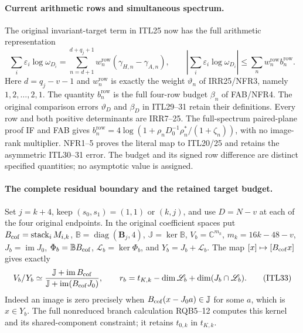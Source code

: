 \documentclass[11pt,a4paper]{article}
\begin{document}
\paragraph{Current arithmetic rows and simultaneous spectrum.}
The original invariant-target term in ITL25 now has the
full arithmetic representation
\[
 \sum_i\varepsilon_i\log\omega_{D_i}
   =\sum_{n=d+1}^{d+q_j+1}w_n^{\mathrm{row}}
                  (\gamma_{H,n}-\gamma_{A,n}),\qquad
 \left|\sum_i\varepsilon_i\log\omega_{D_i}\right|
   \le\sum_n w_n^{\mathrm{row}}b_n^{\mathrm{row}}.\tag{ITL32}
\]
Here $d=q_j-v-1$ and $w_n^{\mathrm{row}}$ is exactly the
weight $\vartheta_n$ of IRR25/NFR3, namely $1,2,\ldots,2,1$.
The quantity $b_n^{\mathrm{row}}$ is the full four-row budget
$\beta_n$ of FAB/NFR4. The original comparison errors
$\vartheta_D$ and $\beta_D$ in ITL29--31 retain their definitions.
Every row and both positive determinants are IRR7--25.
The full-spectrum paired-plane proof IF and FAB gives
$b_n^{\mathrm{row}}=4\log(1+\rho_nD_0^{-1}\rho_n^*/(1+\zeta_n))$,
with no image-rank multiplier. NFR1--5 proves the literal
map to ITL20/25 and retains the asymmetric ITL30--31 error.
The budget and its signed row difference are distinct
specified quantities; no asymptotic value is assigned.


\paragraph{The complete residual boundary and the retained target budget.}
Set $j=k+4$, keep $(s_0,s_1)=(1,1)$ or $(k,j)$, and use
$D=N-v$ at each of the four original endpoints. In the original
coefficient spaces put
$B_{\rm cof}=\operatorname{stack}_iM_{i,k}$,
$\mathbb B=\operatorname{diag}(\mathbf B_j,4)$,
$\mathbb J=\ker\mathbb B$, $V_b=\mathbb C^{m_k}$,
$m_k=16k-48-v$, $J_b=\operatorname{im}J_0$,
$\Phi_b=\mathbb B B_{\rm cof}$,
$\mathscr L_b=\ker\Phi_b$, and $Y_b=J_b+\mathscr L_b$.
The map $[x]\mapsto[B_{\rm cof}x]$ gives exactly
\[
 V_b/Y_b\simeq
 \frac{\mathbb J+\operatorname{im}B_{\rm cof}}
      {\mathbb J+\operatorname{im}(B_{\rm cof}J_0)},\qquad
 r_b=t_{K,k}-\dim\mathscr L_b+
                   \dim(J_b\cap\mathscr L_b).                  \tag{ITL33}
\]
Indeed an image is zero precisely when
$B_{\rm cof}(x-J_0a)\in\mathbb J$ for some $a$, which is
$x\in Y_b$. The full nonreduced branch calculation RQB5--12
computes this kernel and its shared-component constraint; it
retains $t_{0,k}$ in $t_{K,k}$.
\end{document}
